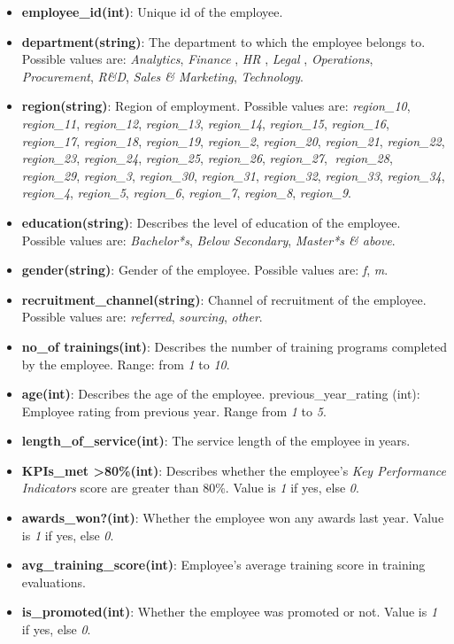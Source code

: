 \documentclass[runningheads]{llncs}
\providecommand{\tightlist}{%
\setlength{\itemsep}{0pt}\setlength{\parskip}{0pt}}
\begin{document}
\begin{itemize}
\tightlist
\item
  \textbf{employee\_id(int)}: Unique id of the employee.
\item
  \textbf{department(string)}: The department to which the employee
  belongs to. Possible values are: \emph{Analytics}, \emph{Finance} ,
  \emph{HR} , \emph{Legal} , \emph{Operations}, \emph{Procurement},
  \emph{R\&D}, \emph{Sales \& Marketing}, \emph{Technology}.
\item
  \textbf{region(string)}: Region of employment. Possible values are:
  \emph{region\_10}, \emph{region\_11}, \emph{region\_12},
  \emph{region\_13}, \emph{region\_14}, \emph{region\_15},
  \emph{region\_16}, \emph{region\_17}, \emph{region\_18},
  \emph{region\_19}, \emph{region\_2}, \emph{region\_20},
  \emph{region\_21}, \emph{region\_22}, \emph{region\_23},
  \emph{region\_24}, \emph{region\_25}, \emph{region\_26},
  \emph{region\_27}, \emph{region\_28}, \emph{region\_29},
  \emph{region\_3}, \emph{region\_30}, \emph{region\_31},
  \emph{region\_32}, \emph{region\_33}, \emph{region\_34},
  \emph{region\_4}, \emph{region\_5}, \emph{region\_6},
  \emph{region\_7}, \emph{region\_8}, \emph{region\_9}.
\item
  \textbf{education(string)}: Describes the level of education of the
  employee. Possible values are: \emph{Bachelor*s}, \emph{Below
  Secondary}, \emph{Master*s \& above}.
\item
  \textbf{gender(string)}: Gender of the employee. Possible values are:
  \emph{f}, \emph{m}.
\item
  \textbf{recruitment\_channel(string)}: Channel of recruitment of the
  employee. Possible values are: \emph{referred}, \emph{sourcing},
  \emph{other}.
\item
  \textbf{no\_of trainings(int)}: Describes the number of training
  programs completed by the employee. Range: from \emph{1} to \emph{10}.
\item
  \textbf{age(int)}: Describes the age of the employee.
  previous\_year\_rating (int): Employee rating from previous year.
  Range from \emph{1} to \emph{5}.
\item
  \textbf{length\_of\_service(int)}: The service length of the employee
  in years.
\item
  \textbf{KPIs\_met \textgreater80\%(int)}: Describes whether the
  employee's \emph{Key Performance Indicators} score are greater than
  80\%. Value is \emph{1} if yes, else \emph{0}.
\item
  \textbf{awards\_won?(int)}: Whether the employee won any awards last
  year. Value is \emph{1} if yes, else \emph{0}.
\item
  \textbf{avg\_training\_score(int)}: Employee's average training score
  in training evaluations.
\item
  \textbf{is\_promoted(int)}: Whether the employee was promoted or not.
  Value is \emph{1} if yes, else \emph{0}.
\end{itemize}
\end{document}
